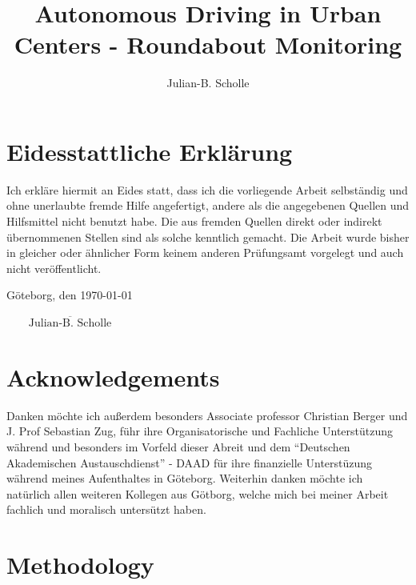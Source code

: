 \documentclass[11pt,oneside,openright]{mpreport}
\title{Autonomous Driving in Urban Centers - Roundabout Monitoring}
\author{Julian-B. Scholle}
\begin{document}
\maketitle



\chapter*{Eidesstattliche Erklärung}
Ich erkläre hiermit an Eides statt, dass ich die vorliegende Arbeit selbständig und
ohne unerlaubte fremde Hilfe angefertigt, andere als die angegebenen Quellen und
Hilfsmittel nicht benutzt habe. Die aus fremden Quellen direkt oder indirekt
übernommenen Stellen sind als solche kenntlich gemacht.
Die Arbeit wurde bisher in gleicher oder ähnlicher Form keinem anderen
Prüfungsamt vorgelegt und auch nicht veröffentlicht.

\noindent Göteborg, den \today
\begin{flushright}
$\overline{~~~~~~~~~\mbox{Julian-B. Scholle}~~~~~~~~~}$
\end{flushright}


\chapter*{Acknowledgements}
Danken möchte ich außerdem besonders Associate professor Christian Berger und J. Prof Sebastian Zug, führ ihre Organisatorische und Fachliche Unterstützung während und besonders im Vorfeld dieser Abreit und
dem ``Deutschen Akademischen Austauschdienst'' - DAAD für ihre finanzielle Unterstüzung während meines Aufenthaltes in Göteborg.
Weiterhin danken möchte ich natürlich allen weiteren Kollegen aus Götborg, welche mich bei meiner Arbeit fachlich und moralisch untersützt haben.



\tableofcontents
\clearpage 





\chapter{Methodology}
\end{document}
